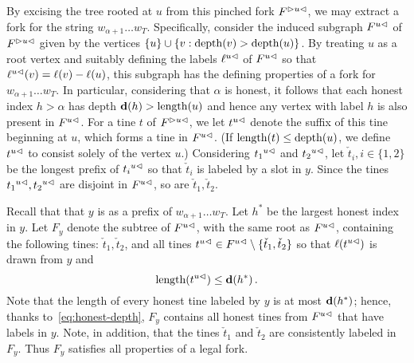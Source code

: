     By excising the tree rooted at $u$ from this pinched fork
    $\pinch{u}{F}$, we may extract a fork for the string
    $w_{\alpha+1} \dots w_T$. Specifically, consider the induced
    subgraph $\cut{u}{F}$ of $\pinch{u}{F}$ given by the vertices
    $\{u\} \cup \{ v \SuchThat \depth(v) > \depth(u)\}$. By treating $u$ as a
    root vertex and suitably defining the labels $\cut{u}{\ell}$ of
    $\cut{u}{F}$ so that $\cut{u}{\ell}(v) = \ell(v) - \ell(u)$, this
    subgraph has the defining properties of a fork for
    $w_{\alpha+1} \ldots w_T$. In particular, considering that
    $\alpha$ is honest, it follows that each honest index $h > \alpha$
    has depth $\hdepth(h) > \length(u)$ and hence any vertex with label $h$ 
    is also present in $\cut{u}{F}$. 
    For a tine $t$ of $\pinch{u}{F}$, we let $\cut{u}{t}$
    denote the suffix of this tine beginning at $u$, which forms a tine
    in $\cut{u}{F}$. (If $\length(t) \leq \depth(u)$, we define
    $\cut{u}{t}$ to consist solely of the vertex $u$.)  
    Considering $\cut{u}{t_1}$ and $\cut{u}{t_2}$, 
    let $\check{t}_i, i \in \{1, 2\}$ be the longest prefix of $\cut{u}{t_i}$ 
    so that $\check{t}_i$ is labeled by a slot in $y$.
    Since the tines $\cut{u}{t_1}, \cut{u}{t_2}$ are disjoint in $\cut{u}{F}$, 
    so are $\check{t}_1,\check{t}_2$. 
    
    Recall that that $y$ is as a prefix of $w_{\alpha+1} \ldots w_T$.
    Let $h^*$ be the largest honest index in $y$. 
    Let $F_y$ denote the subtree of $\cut{u}{F}$, with the same root as $\cut{u}{F}$, 
    containing the following tines: 
    $\check{t}_1, \check{t}_2$, and 
    all tines $\cut{u}{t} \in \cut{u}{F} \setminus \{\check{t}_1, \check{t}_2\}$ so that 
    $\ell(\cut{u}{t})$ is drawn from $y$ and 
    \begin{equation}\label{eq:tines-Fy}
      \length(\cut{u}{t}) \leq \hdepth(h^*)
      \,.
    \end{equation}
    Note that the length of every honest tine 
    labeled by $y$ is at most $\hdepth(h^*)$; 
    hence, thanks to~\eqref{eq:honest-depth}, 
    $F_y$ contains all honest tines from $\cut{u}{F}$ 
    that have labels in $y$. 
    Note, in addition, that the tines $\check{t}_1$ and $\check{t}_2$ 
    are consistently labeled in $F_y$. 
    Thus $F_y$ satisfies all properties of a legal fork. 
    
